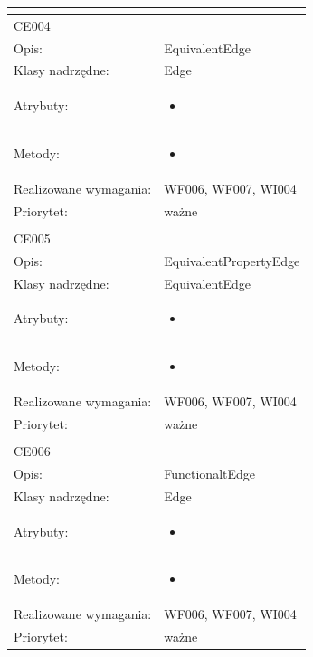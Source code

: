 \documentclass[a4paper,10pt]{article}
\begin{document}
\begin{center}
\begin{longtable}{|m{3cm}|m{9cm}|}
\multicolumn{2}{c}{} \\
 \hline

CE004 &  \\ \hline
Opis: & EquivalentEdge    \\ \hline
Klasy nadrzędne: & Edge    \\ \hline
Atrybuty: & \begin{itemize}
 \item 
\end{itemize}
 \\ \hline
Metody: & \begin{itemize}
 \item 
\end{itemize}
  \\ \hline
Realizowane wymagania: & WF006, WF007, WI004 \\ \hline
Priorytet: & ważne  \\ \hline

\multicolumn{2}{c}{} \\
 \hline

CE005 &  \\ \hline
Opis: & EquivalentPropertyEdge    \\ \hline
Klasy nadrzędne: & EquivalentEdge    \\ \hline
Atrybuty: & \begin{itemize}
 \item 
\end{itemize}
 \\ \hline
Metody: & \begin{itemize}
 \item 
\end{itemize}
  \\ \hline
Realizowane wymagania: & WF006, WF007, WI004 \\ \hline
Priorytet: & ważne  \\ \hline

\multicolumn{2}{c}{} \\
 \hline

CE006 &  \\ \hline
Opis: & FunctionaltEdge    \\ \hline
Klasy nadrzędne: & Edge    \\ \hline
Atrybuty: & \begin{itemize}
 \item 
\end{itemize}
 \\ \hline
Metody: & \begin{itemize}
 \item 
\end{itemize}
  \\ \hline
Realizowane wymagania: & WF006, WF007, WI004 \\ \hline
Priorytet: & ważne  \\ \hline


\end{longtable}
\end{center}
\end{document}
